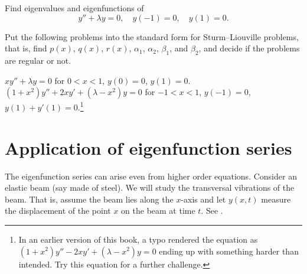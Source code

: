 \setcounter{exercise}{100}

\begin{exercise}
Find eigenvalues and eigenfunctions of
\begin{equation*}
y'' + \lambda y = 0, \quad y(-1) = 0, \quad y(1) = 0 .
\end{equation*}
\end{exercise}

\begin{exercise}
Put the following problems into the standard form for Sturm--Liouville
problems, that is, find $p(x)$, $q(x)$, $r(x)$,
$\alpha_1$,
$\alpha_2$,
$\beta_1$, and
$\beta_2$,
and decide if the problems are regular or not.
\begin{tasks}
\task $x y'' + \lambda y = 0$
\enspace for $0 < x < 1$,
\enspace $y(0) = 0$,
\enspace $y(1) = 0$.
\task
$(1+x^2) y'' + 2xy' + (\lambda-x^2) y = 0$
\enspace for $-1 < x < 1$,
\enspace $y(-1) = 0$,
\enspace $y(1)+y'(1) = 0$.\footnote{%
In an earlier version of this book, a typo rendered the equation
as $(1+x^2) y'' - 2xy' + (\lambda-x^2) y = 0$ ending up with something
harder than intended.  Try this equation for a further challenge.}
\end{tasks}
\end{exercise}


\sectionnewpage
\section{Application of eigenfunction series}
\label{sec:appeig}


The eigenfunction series can arise even from higher order equations.
Consider an elastic beam (say made of steel).  We will study the
transversal vibrations of the beam.  That is, assume the beam lies along
the $x$-axis and let $y(x,t)$ measure the displacement of the point $x$
on the beam at time $t$.  See .


